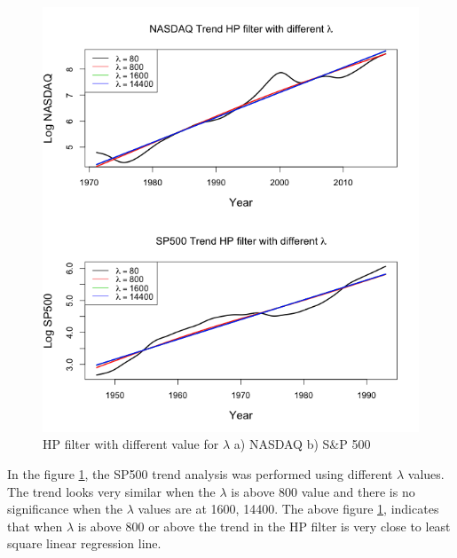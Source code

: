 \begin{figure}[!ht]
\centering
\includegraphics[scale=.65]{Images/Lambda}
\caption{HP filter with different value for $\lambda$ a) NASDAQ b) S\&P 500}
\label{fig:Lambda}
\end{figure}
In the figure \ref{fig:Lambda}, the SP500 trend analysis was performed using different $\lambda$ values. The trend looks very similar when the $\lambda$ is above 800 value and there is no significance when the $\lambda$ values are at 1600, 14400. The above figure \ref{fig:Lambda}, indicates that when $\lambda$ is above 800 or above the trend in the HP filter is very close to least square linear regression line. 

